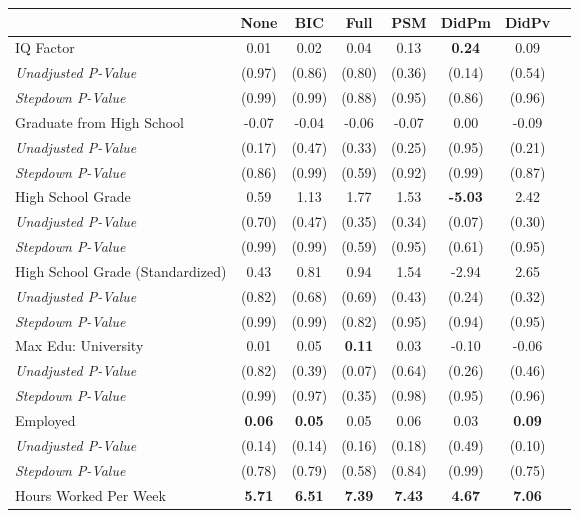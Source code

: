 \begin{tabular}{l c c c c c c c}
\toprule
 & None & BIC & Full & PSM & DidPm & DidPv \\
\midrule
IQ Factor & 0.01 & 0.02 & 0.04 & 0.13 & \textbf{ 0.24 } & 0.09 \\
\quad \textit{Unadjusted P-Value} & (0.97) & (0.86) & (0.80) & (0.36) & (0.14) & (0.54) \\
\quad \textit{Stepdown P-Value} & (0.99) & (0.99) & (0.88) & (0.95) & (0.86) & (0.96) \\
Graduate from High School & -0.07 & -0.04 & -0.06 & -0.07 & 0.00 & -0.09 \\
\quad \textit{Unadjusted P-Value} & (0.17) & (0.47) & (0.33) & (0.25) & (0.95) & (0.21) \\
\quad \textit{Stepdown P-Value} & (0.86) & (0.99) & (0.59) & (0.92) & (0.99) & (0.87) \\
High School Grade & 0.59 & 1.13 & 1.77 & 1.53 & \textbf{ -5.03 } & 2.42 \\
\quad \textit{Unadjusted P-Value} & (0.70) & (0.47) & (0.35) & (0.34) & (0.07) & (0.30) \\
\quad \textit{Stepdown P-Value} & (0.99) & (0.99) & (0.59) & (0.95) & (0.61) & (0.95) \\
High School Grade (Standardized) & 0.43 & 0.81 & 0.94 & 1.54 & -2.94 & 2.65 \\
\quad \textit{Unadjusted P-Value} & (0.82) & (0.68) & (0.69) & (0.43) & (0.24) & (0.32) \\
\quad \textit{Stepdown P-Value} & (0.99) & (0.99) & (0.82) & (0.95) & (0.94) & (0.95) \\
Max Edu: University & 0.01 & 0.05 & \textbf{ 0.11 } & 0.03 & -0.10 & -0.06 \\
\quad \textit{Unadjusted P-Value} & (0.82) & (0.39) & (0.07) & (0.64) & (0.26) & (0.46) \\
\quad \textit{Stepdown P-Value} & (0.99) & (0.97) & (0.35) & (0.98) & (0.95) & (0.96) \\
Employed & \textbf{ 0.06 } & \textbf{ 0.05 } & 0.05 & 0.06 & 0.03 & \textbf{ 0.09 } \\
\quad \textit{Unadjusted P-Value} & (0.14) & (0.14) & (0.16) & (0.18) & (0.49) & (0.10) \\
\quad \textit{Stepdown P-Value} & (0.78) & (0.79) & (0.58) & (0.84) & (0.99) & (0.75) \\
Hours Worked Per Week & \textbf{ 5.71 } & \textbf{ 6.51 } & \textbf{ 7.39 } & \textbf{ 7.43 } & \textbf{ 4.67 } & \textbf{ 7.06 } \\

\end{tabular}
